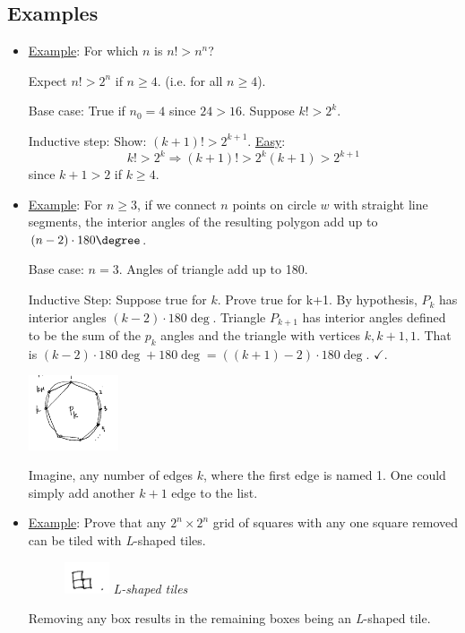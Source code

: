 \documentclass[12pt]{article}
\begin{document}
\subsection{Examples}
\label{sec:org8e65f25}
\begin{itemize}
\item \uline{Example}: For which \(n\) is \(n!>n^{n}\)?

Expect \(n!>2^n\) if \(n\ge{}4\). (i.e. for all \(n\ge{}4\)).

Base case: True if \(n_{0}=4\) since \(24>16\). Suppose \(k!>2^{k}\). 

Inductive step: Show: \((k+1)!>2^{k+1}\). \uline{Easy}: $$k!>2^{k} \Rightarrow
    (k+1)!>2^{k}(k+1)>2^{k+1}$$ since \(k+1>2\) if \(k\ge{}4\).

\item \uline{Example}: For \(n\ge3\), if we connect \(n\) points on circle \(w\) with straight
line segments, the interior angles of the resulting polygon add up to
\((n-2)\cdot180\degree\).

Base case: \(n=3\). Angles of triangle add up to 180\textdegree{}. 

Inductive Step: Suppose true for \(k\). Prove true for k+1. By hypothesis,
\(P_{k}\) has interior angles \((k-2)\cdot180\deg\). Triangle \(P_{k+1}\) has
interior angles defined to be the sum of the \(p_{k}\) angles and the triangle
with vertices \(k, k+1, 1\). That is \((k-2)\cdot180\deg + 180\deg =
    ((k+1)-2)\cdot180\deg\). \(\checkmark\).

\begin{center}
\includegraphics[width=100]{Midterm two/screenshot_2017-03-03_16-17-22.png}
\end{center} Imagine, any number of
edges \(k\), where the first edge is named 1. One could simply add another
\(k+1\) edge to the list.

\item \uline{Example}: Prove that any \(2^n\times2^n\) grid of squares with any one
square removed can be tiled with \emph{L}-shaped tiles.

\begin{figure}[htbp]
\centering
\includegraphics[width=50]{Midterm two/screenshot_2017-03-03_15-48-14.png}
\Leftarrow\textit{L-shaped tiles}
\end{figure} Removing any box
results in the remaining boxes being an \emph{L}-shaped tile.


\end{itemize}
\end{document}
